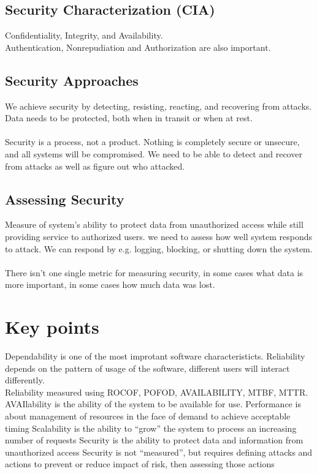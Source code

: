 \subsection{Security Characterization (CIA)}
Confidentiality, Integrity, and Availability.\\
Authentication, Nonrepudiation and Authorization are also important.\\
\subsection{Security Approaches}
We achieve security by detecting, resisting, reacting, and recovering from attacks. Data needs to be protected, both when in transit or when at rest.\\
\\
Security is a process, not a product. Nothing is completely secure or unsecure, and all systems will be compromised.  We need to be able to detect and recover from attacks as well as figure out who attacked.
\subsection{Assessing Security}
Measure of system's ability to protect data from unauthorized access while still providing service to authorized users. we need to assess how well system responds to attack. We can respond by e.g. logging, blocking, or shutting down the system.\\
\\
There isn't one single metric for measuring security, in some cases what data is more important, in some cases how much data was lost.

\section{Key points}
Dependability is one of the most improtant software characteristicts. Reliability depends on the pattern of usage of the software, different users will interact differently.\\
Reliability measured using ROCOF, POFOD, AVAILABILITY, MTBF, MTTR.\\
AVAIlability is the ability of the system to be available for use.
Performance is about management of resources in the face of demand to achieve acceptable timing
Scalability is the ability to “grow” the system to process an increasing number of requests
Security is the ability to protect data and information from unauthorized access
Security is not “measured”, but requires defining attacks and actions to prevent or reduce impact of risk, then assessing those actions